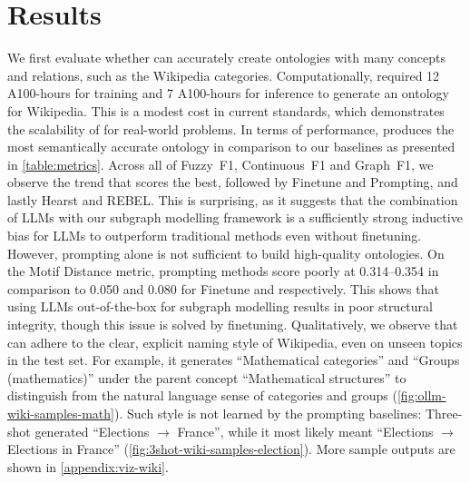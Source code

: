 \section{Results}  \label{sec:results}



We first evaluate whether \name can accurately create ontologies with many concepts and relations, such as the Wikipedia categories. Computationally, \name required 12 A100-hours for training and 7 A100-hours for inference to generate an ontology for Wikipedia. This is a modest cost in current standards, which demonstrates the scalability of \name for real-world problems.
In terms of performance, \name produces the most semantically accurate ontology in comparison to our baselines as presented in \cref{table:metrics}. Across all of Fuzzy~F1, Continuous~F1 and Graph~F1, we observe the trend that \name scores the best, followed by Finetune and Prompting, and lastly Hearst and REBEL. This is surprising, as it suggests that the combination of LLMs with our subgraph modelling framework is a sufficiently strong inductive bias for LLMs to outperform traditional methods even without finetuning. However, prompting alone is not sufficient to build high-quality ontologies.
On the Motif Distance metric, prompting methods score poorly at 0.314--0.354 in comparison to 0.050 and 0.080 for Finetune and \name respectively. This shows that using LLMs out-of-the-box for subgraph modelling results in poor structural integrity, though this issue is solved by finetuning.
Qualitatively, we observe that \name can adhere to the clear, explicit naming style of Wikipedia, even on unseen topics in the test set. For example, it generates ``Mathematical categories'' and ``Groups (mathematics)'' under the parent concept ``Mathematical structures'' to distinguish from the natural language sense of categories and groups (\cref{fig:ollm-wiki-samples-math}). Such style is not learned by the prompting baselines: Three-shot generated ``Elections $\to$ France'', while it most likely meant ``Elections $\to$ Elections in France'' (\cref{fig:3shot-wiki-samples-election}). More sample outputs are shown in \cref{appendix:viz-wiki}.

